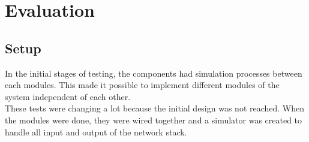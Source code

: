 \chapter{Evaluation}
\label{chap:evaluation}
\section{Setup}
In the initial stages of testing, the components had simulation processes between
each modules. This made it possible to implement different modules of the system
independent of each other.\\

These tests were changing a lot because the initial design was not
reached.
When the modules were done, they were wired together and a simulator
was created to handle all input and output of the network stack.

